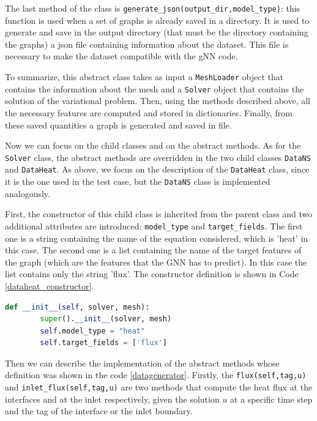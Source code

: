 \documentclass[11pt,a4paper]{article}
\begin{document}
The last method of the class is \texttt{generate\_json(output\_dir,model\_type)}: this function is used when a set of graphs is already saved in a directory. It is used to generate and save in the output directory (that must be the directory containing the graphs) a json file containing information about the dataset. This file is necessary to make the dataset compatible with the gNN code. 

To summarize, this abstract class takes as input a \texttt{MeshLoader} object that contains the information about the mesh and a \texttt{Solver} object that contains the solution of the variational problem. Then, using the methods described above, all the necessary features are computed and stored in dictionaries. Finally, from these saved quantities a graph is generated and saved in file. 

Now we can focus on the child classes and on the abstract methods.
As for the \texttt{Solver} class, the abstract methods are overridden in the two child classes \texttt{DataNS} and \texttt{DataHeat}. 
As above, we focus on the description of the \texttt{DataHeat} class, since it is the one used in the test case, but the \texttt{DataNS} class is implemented analogously. 

First, the constructor of this child class is inherited from the parent class and two additional attributes are introduced: \texttt{model\_type} and \texttt{target\_fields}. The first one is a string containing the name of the equation considered, which is 'heat' in this case. The second one is a list containing the name of the target features of the graph (which are the features that the GNN has to predict). In this case the list contains only the string 'flux'. The constructor definition is shown in Code \ref{dataheat_constructor}.

\begin{lstlisting}[language=Python, caption={Solver class.}, label={dataheat_constructor}]
    def __init__(self, solver, mesh):
        super().__init__(solver, mesh)
        self.model_type = "heat"
        self.target_fields = ['flux']
\end{lstlisting}

Then we can describe the implementation of the abstract methods whose definition was shown in the code \ref{datagenerator}. 
Firstly, the \texttt{flux(self,tag,u)} and \texttt{inlet\_flux(self,tag,u)} are two methods that compute the heat flux at the interfaces and at the inlet respectively, given the solution \(u\) at a specific time step and the tag of the interface or the inlet boundary. 
\end{document}
